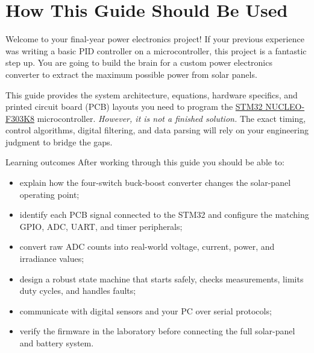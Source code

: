 \documentclass[11pt,a4paper]{article}
\let\originalsection\section
\renewcommand{\section}{\clearpage\originalsection}
\begin{document}
\hypersetup{pageanchor=false}
\pagestyle{empty}

% 

% 
% 

\thispagestyle{empty}
\tableofcontents
\clearpage
\hypersetup{pageanchor=true}
\pagestyle{fancy}

\section{How This Guide Should Be Used}

Welcome to your final-year power electronics project! If your previous experience was writing a basic PID controller on a microcontroller, this project is a fantastic step up. You are going to build the brain for a custom power electronics converter to extract the maximum possible power from solar panels.

This guide provides the system architecture, equations, hardware specifics, and printed circuit board (PCB) layouts you need to program the \href{https://www.st.com/en/evaluation-tools/nucleo-f303k8.html}{STM32 NUCLEO-F303K8} microcontroller. \textit{However, it is not a finished solution.} The exact timing, control algorithms, digital filtering, and data parsing will rely on your engineering judgment to bridge the gaps.

\begin{guidebox}{Learning outcomes}
After working through this guide you should be able to:
\begin{itemize}
  \item explain how the four-switch buck-boost converter changes the solar-panel operating point;
  \item identify each PCB signal connected to the STM32 and configure the matching GPIO, ADC, UART, and timer peripherals;
  \item convert raw ADC counts into real-world voltage, current, power, and irradiance values;
  \item design a robust state machine that starts safely, checks measurements, limits duty cycles, and handles faults;
  \item communicate with digital sensors and your PC over serial protocols;
  \item verify the firmware in the laboratory before connecting the full solar-panel and battery system.
\end{itemize}
\end{guidebox}
\end{document}
